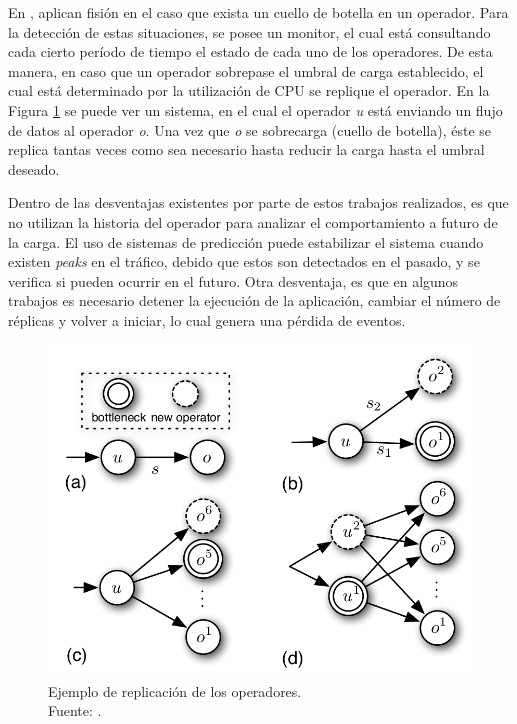 En \citep{FernandezMKP13}, aplican fisión en el caso que exista un cuello de botella en un operador. Para la detección de estas situaciones, se posee un monitor, el cual está consultando cada cierto período de tiempo el estado de cada uno de los operadores. De esta manera, en caso que un operador sobrepase el umbral de carga establecido, el cual está determinado por la utilización de CPU se replique el operador. En la Figura \ref{fig:ejFision} se puede ver un sistema, en el cual el operador \textit{u} está enviando un flujo de datos al operador \textit{o}. Una vez que \textit{o} se sobrecarga (cuello de botella),\normalsize{ éste se replica tantas veces como sea necesario hasta reducir la carga hasta el umbral deseado.}

Dentro de las desventajas existentes por parte de estos trabajos realizados, es que no utilizan la historia del operador para analizar el comportamiento a futuro de la carga. El uso de sistemas de predicción puede estabilizar el sistema cuando existen \textit{peaks} en el tráfico, debido que estos son detectados en el pasado, y se verifica si pueden ocurrir en el futuro. \normalsize{Otra} desventaja, es que en algunos trabajos es necesario detener la ejecución de la aplicación, cambiar el número de réplicas y volver a iniciar, lo cual genera una pérdida de eventos.

\begin{figure}[!ht]
	\centering
	\includegraphics[scale=0.3]{images/EjFision.png}
	\caption[Ejemplo de replicación de los operadores.]{Ejemplo de replicación de los operadores.\\Fuente: \cite{FernandezMKP13}.}
	\label{fig:ejFision}
\end{figure}